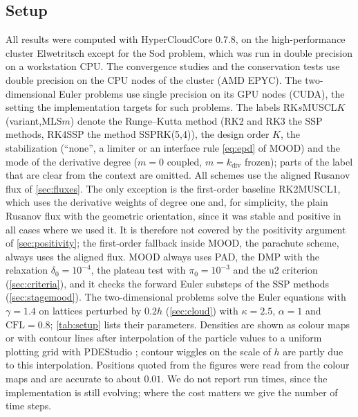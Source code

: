 \documentclass[smallextended]{svjour3}
\numberwithin{equation}{section}
\newcommand{\CFL}{\mathrm{CFL}}
\begin{document}
\subsection{Setup}\label{sec:setup}

All results were computed with HyperCloudCore 0.7.8, on the high-performance cluster Elwetritsch except for the Sod problem, which was run in double precision on a workstation CPU. The convergence studies and the conservation tests use double precision on the CPU nodes of the cluster (AMD EPYC). The two-dimensional Euler problems use single precision on its GPU nodes (CUDA), the setting the implementation targets for such problems. The labels RK$s$MUSCL$K$(variant,MLS$m$) denote the Runge--Kutta method (RK2 and RK3 the SSP methods, RK4SSP the method SSPRK(5,4)), the design order $K$, the stabilization (``none'', a limiter or an interface rule \eqref{eq:epd} of MOOD) and the mode of the derivative degree ($m=0$ coupled, $m=k_{\mathrm{div}}$ frozen); parts of the label that are clear from the context are omitted. All schemes use the aligned Rusanov flux of \cref{sec:fluxes}. The only exception is the first-order baseline RK2MUSCL1, which uses the derivative weights of degree one and, for simplicity, the plain Rusanov flux with the geometric orientation, since it was stable and positive in all cases where we used it. It is therefore not covered by the positivity argument of \cref{sec:positivity}; the first-order fallback inside MOOD, the parachute scheme, always uses the aligned flux. MOOD always uses PAD, the DMP with the relaxation $\delta_0=10^{-4}$, the plateau test with $\pi_0=10^{-3}$ and the u2 criterion (\cref{sec:criteria}), and it checks the forward Euler substeps of the SSP methods (\cref{sec:stagemood}). The two-dimensional problems solve the Euler equations with $\gamma=1.4$ on lattices perturbed by $0.2h$ (\cref{sec:cloud}) with $\kappa=2.5$, $\alpha=1$ and $\CFL=0.8$; \cref{tab:setup} lists their parameters. Densities are shown as colour maps or with contour lines after interpolation of the particle values to a uniform plotting grid with PDEStudio \cite{jung_pdestudio}; contour wiggles on the scale of $h$ are partly due to this interpolation. Positions quoted from the figures were read from the colour maps and are accurate to about $0.01$. We do not report run times, since the implementation is still evolving; where the cost matters we give the number of time steps.
\end{document}
